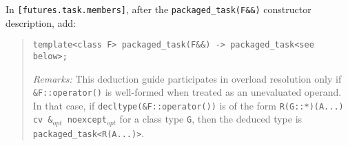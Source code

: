 \documentclass[11pt]{article}
\begin{document}
In \texttt{[futures.task.members]}, after the
\texttt{packaged\_task(F\&\&)} constructor description, add:

\begin{quote}
\texttt{template<class F> packaged\_task(F\&\&) -> packaged\_task<see below>;}

\textit{Remarks:} This deduction guide participates in overload
resolution only if \texttt{\&F​::​operator()} is well-formed when treated
as an unevaluated operand.  In that case, if
\texttt{decltype(\&F​::​operator())} is of the form
\texttt{R(G​::​*)(A...) cv \&$_{opt}$ noexcept$_{opt}$} for a class type
\texttt{G}, then the deduced type is \texttt{packaged\_task<R(A...)>}.
\end{quote}




%
%
\end{document}
